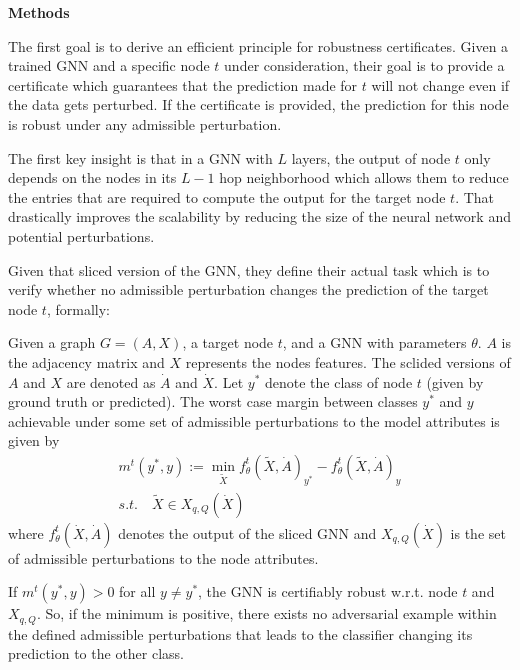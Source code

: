 \documentclass[a4paper,preprint]{sig-alternate}
\begin{document}
\textbf{Methods}\newline

The first goal is to derive an efficient principle for robustness certificates. Given a trained GNN and a specific node $t$ under consideration,
their goal is to provide a certificate which guarantees that the prediction made for $t$ will not change even if the data gets perturbed.
If the certificate is provided, the prediction for this node is robust under any admissible perturbation.\newline

The first key insight is that in a GNN with $L$ layers, the output of node $t$ only depends on the nodes in its $L-1$ hop neighborhood
which allows them to reduce the entries that are required to compute the output for the target node $t$. That drastically improves the scalability
by reducing the size of the neural network and potential perturbations.\newline

Given that sliced version of the GNN, they define their actual task which is to verify whether no admissible perturbation changes the prediction
of the target node $t$, formally:\newline

Given a graph $G = (A, X)$, a target node $t$, and a GNN with parameters $\theta$. $A$ is the adjacency matrix and $X$ represents the nodes features.
The sclided versions of $A$ and $X$ are denoted as $\dot{A}$ and $\dot{X}$. Let $y^*$ denote the class of node $t$ (given by ground truth or predicted).
The worst case margin between classes $y^*$ and $y$ achievable under some set of admissible perturbations to the model attributes is given by\newline
\begin{gather} 
    m^t (y^*, y) := \min_{\tilde{X}} f_{\theta}^t(\tilde{X}, \dot{A})_{y^*} - f_{\theta}^t(\tilde{X}, \dot{A})_y \\
    s.t. \quad \tilde{X} \in X_{q, Q} (\dot{X})
\end{gather}
where $f_{\theta}^t(\dot{X}, \dot{A})$ denotes the output of the sliced GNN and $X_{q, Q} (\dot{X})$ is the set of admissible perturbations
to the node attributes.

If $m^t (y^*, y) > 0$ for all $y \neq y^*$, the GNN is certifiably robust w.r.t. node $t$ and $X_{q, Q}$. So, if the minimum is positive,
there exists no adversarial example within the defined admissible perturbations that leads to the classifier changing its prediction to the other class.
\end{document}
